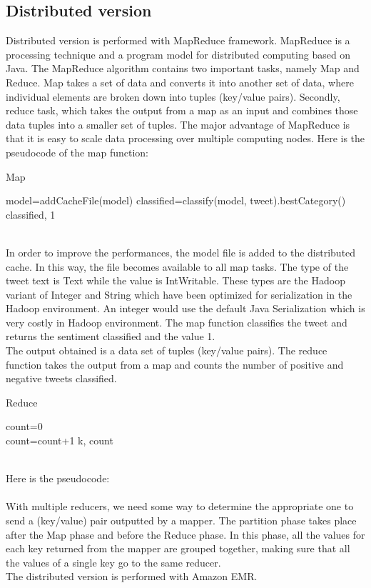 \documentclass[10pt,twocolumn,letterpaper]{article}
\begin{document}
\subsection{Distributed version}
Distributed version is performed with MapReduce framework. MapReduce is a processing technique and a program model for distributed computing based on Java. The MapReduce algorithm contains two important tasks, namely Map and Reduce.  Map takes a set of data and converts it into another set of data, where individual elements are broken down into tuples (key/value pairs). Secondly, reduce task, which takes the output from a map as an input and combines those data tuples into a smaller set of tuples. The major advantage of MapReduce is that it is easy to scale data processing over multiple computing nodes. Here is the pseudocode of the map function:\\
\begin{algorithm}
\label{Map}
\caption{Map}
\begin{algorithmic}
\State model=addCacheFile(model)
\State classified=classify(model, tweet).bestCategory()
\State \Return classified, 1
\end{algorithmic}
\end{algorithm} \\
In order to improve the performances, the model file is added to the distributed cache. In this way, the file becomes available to all map tasks. The type of the tweet text is Text while the value is IntWritable. These types are the Hadoop variant of Integer and String which have been optimized for serialization in the Hadoop environment. An integer would use the default Java Serialization which is very costly in Hadoop environment. The map function classifies the tweet and returns the sentiment classified and the value 1.\\
The output obtained is a data set of tuples (key/value pairs). The reduce function takes the output from a map and counts the number of positive and negative tweets classified.
\begin{algorithm}
\label{Reduce}
\caption{Reduce}
\begin{algorithmic}
\State count=0
    	 \do \\
		\State count=count+1
	\EndFor 
\State \Return k, count
\end{algorithmic}
\end{algorithm} \\
Here is the pseudocode:\\ \\
With multiple reducers, we need some way to determine the appropriate one to send a (key/value) pair outputted by a mapper. The partition phase takes place after the Map phase and before the Reduce phase. In this phase, all the values for each key returned from the mapper are grouped together, making sure that all the values of a single key go to the same reducer.
\\The distributed version is performed with Amazon EMR.
\end{document}
